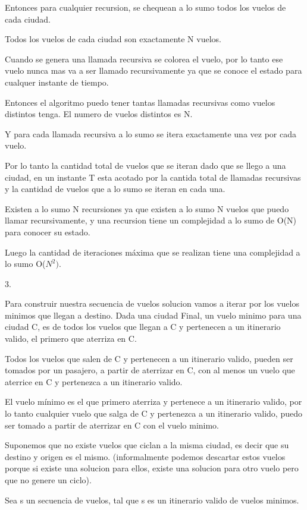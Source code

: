 Entonces para cualquier recursion, se chequean a lo sumo todos los vuelos de cada ciudad.

Todos los vuelos de cada ciudad son exactamente N vuelos.

Cuando se genera una llamada recursiva se colorea el vuelo, por lo tanto ese vuelo nunca mas va a ser llamado recursivamente ya que se conoce el estado para cualquer instante de tiempo.

Entonces el algoritmo puedo tener tantas llamadas recursivas como vuelos distintos tenga.
El numero de vuelos distintos es N.

Y para cada llamada recursiva a lo sumo se itera exactamente una vez por cada vuelo.

Por lo tanto la cantidad total de vuelos que se iteran dado que se llego a una ciudad, en un instante T esta acotado por la cantida total de llamadas recursivas y la cantidad de vuelos que a lo sumo se iteran en cada una.

Existen a lo sumo N recursiones ya que existen a lo sumo N vuelos que puedo llamar recursivamente, y una recursion tiene un complejidad a lo sumo de O(N) para conocer su estado.

Luego la cantidad de iteraciones m\'axima que se realizan tiene una complejidad a lo sumo O($N^{2})$.

3.

Para construir nuestra secuencia de vuelos solucion vamos a iterar por los vuelos minimos que llegan a destino.
Dada una ciudad Final, un vuelo minimo para una ciudad C, es de todos los vuelos que llegan a C y pertenecen a un itinerario valido, el primero que aterriza en C. 

Todos los vuelos que salen de C y pertenecen a un itinerario valido, pueden ser tomados por un pasajero, a partir de aterrizar en C, con al menos un vuelo que aterrice en C y pertenezca a un itinerario valido.

El vuelo m\'inimo es el que primero aterriza y pertenece a un itinerario valido, por lo tanto cualquier vuelo que salga de C y pertenezca a un itinerario valido, puedo ser tomado a partir de aterrizar en C con el vuelo minimo.

Suponemos que no existe vuelos que ciclan a la misma ciudad, es decir que su destino y origen es el mismo. (informalmente podemos descartar estos vuelos porque si existe una solucion para ellos, existe una solucion para otro vuelo pero que no genere un ciclo).

Sea s un secuencia de vuelos, tal que s es un itinerario valido de vuelos minimos.

